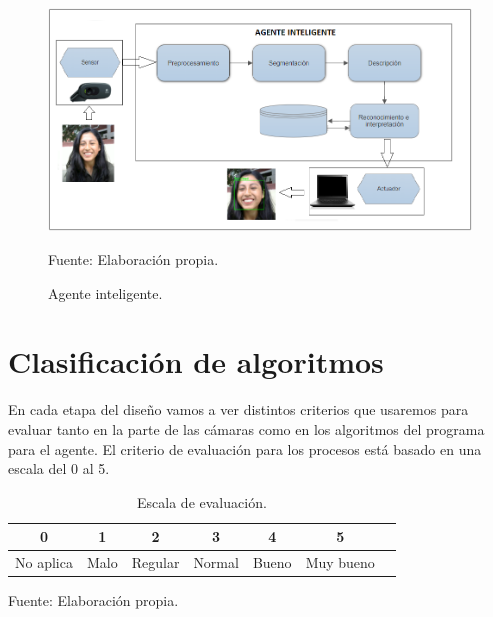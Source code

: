 \begin{figure}[ht]
\begin{center}
\includegraphics[width=1\textwidth]{Imagen26}
\end{center}
\begin{center}
\vskip -0.5cm
\caption{\small{Agente inteligente.}}
{\small{Fuente: Elaboración propia.}}
\end{center}
\end{figure}

\vskip 3cm

\section{Clasificación de algoritmos}
En cada etapa del diseño vamos a ver distintos criterios que usaremos para evaluar tanto en la parte de las cámaras como en los algoritmos del programa para el agente. El criterio de evaluación para los procesos está basado en una escala del 0 al 5.

\begin{table}[ht!]
\centering
\caption{Escala de evaluación.} \vskip 0.1cm
\begin{tabular}{|c|c|c|c|c|c|c|} \hline
\bf 0 & \bf 1 & \bf 2 & \bf 3 & \bf 4 & \bf 5 \\ \hline
No aplica & Malo & Regular & Normal & Bueno & Muy bueno \\ \hline 
\end{tabular}
\begin{center}
{\small{Fuente: Elaboración propia.}}
\end{center}
\end{table}
\vskip 3cm

